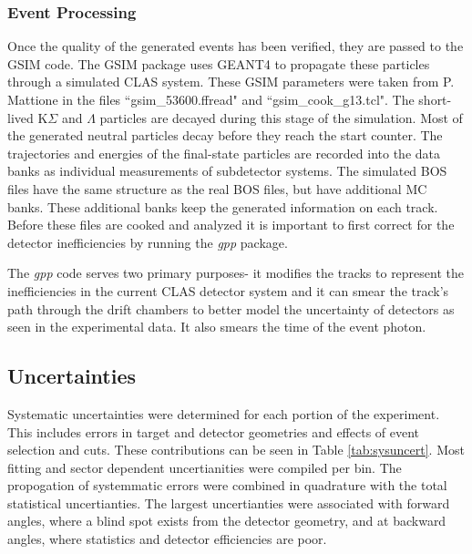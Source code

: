 \documentclass[prb,10pt,twocolumn,tightenlines,superscriptaddress]{revtex4-1}
\begin{document}
\subsubsection{Event Processing}
Once the quality of the generated events has been verified, they are passed to the GSIM code. The GSIM package uses GEANT4 to propagate these particles through a simulated CLAS system. These GSIM parameters were taken from P. Mattione in the files ``gsim\_53600.ffread" and ``gsim\_cook\_g13.tcl". The short-lived K$\Sigma$ and $\Lambda$ particles are decayed during this stage of the simulation.
Most of the generated neutral particles decay before they reach the start counter.
The trajectories and energies of the final-state particles are recorded into the data banks as individual measurements of subdetector systems.
The simulated BOS files have the same structure as the real BOS files, but have additional MC banks. These additional banks keep the generated information on each track.
Before these files are cooked and analyzed it is important to first correct for the detector inefficiencies by running the \textit{gpp} package.

The \textit{gpp} code serves two primary purposes- it modifies the tracks to represent the inefficiencies in the current CLAS detector system and it can smear the track's path through the drift chambers to better model the uncertainty of detectors as seen in the experimental data. It also smears the time of the event photon. 

\subsection{Uncertainties}
Systematic uncertainties were determined for each portion of the experiment. This includes errors in target and detector geometries and effects of event selection and cuts. These contributions can be seen in Table \ref{tab:sysuncert}. Most fitting and sector dependent uncertianities were compiled per bin. The propogation of systemmatic errors were combined in quadrature with the total statistical uncertianties. The largest uncertianties were associated with forward angles, where a blind spot exists from the detector geometry, and at backward angles, where statistics and detector efficiencies are poor.  
\end{document}
